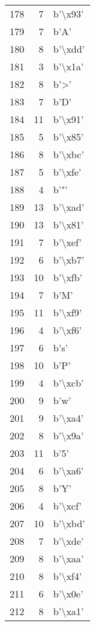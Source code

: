 \begin{tabular}{lrl}
178 &    7 &  b'\textbackslash x93' \\
179 &    7 &     b'A' \\
180 &    8 &  b'\textbackslash xdd' \\
181 &    3 &  b'\textbackslash x1a' \\
182 &    8 &     b'>' \\
183 &    7 &     b'D' \\
184 &   11 &  b'\textbackslash x91' \\
185 &    5 &  b'\textbackslash x85' \\
186 &    8 &  b'\textbackslash xbc' \\
187 &    5 &  b'\textbackslash xfe' \\
188 &    4 &     b'"' \\
189 &   13 &  b'\textbackslash xad' \\
190 &   13 &  b'\textbackslash x81' \\
191 &    7 &  b'\textbackslash xef' \\
192 &    6 &  b'\textbackslash xb7' \\
193 &   10 &  b'\textbackslash xfb' \\
194 &    7 &     b'M' \\
195 &   11 &  b'\textbackslash xf9' \\
196 &    4 &  b'\textbackslash xf6' \\
197 &    6 &     b's' \\
198 &   10 &     b'P' \\
199 &    4 &  b'\textbackslash xcb' \\
200 &    9 &     b'w' \\
201 &    9 &  b'\textbackslash xa4' \\
202 &    8 &  b'\textbackslash x9a' \\
203 &   11 &     b'5' \\
204 &    6 &  b'\textbackslash xa6' \\
205 &    8 &     b'Y' \\
206 &    4 &  b'\textbackslash xcf' \\
207 &   10 &  b'\textbackslash xbd' \\
208 &    7 &  b'\textbackslash xde' \\
209 &    8 &  b'\textbackslash xaa' \\
210 &    8 &  b'\textbackslash xf4' \\
211 &    6 &  b'\textbackslash x0e' \\
212 &    8 &  b'\textbackslash xa1' \\

\end{tabular}
